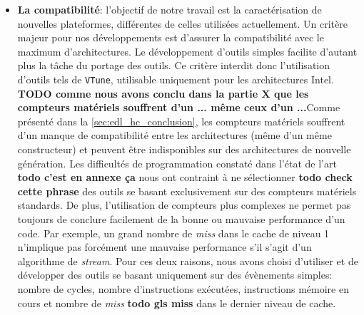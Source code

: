 \begin{itemize}
        \item \textbf{La compatibilité}: l'objectif de notre travail est la caractérisation de nouvelles plateformes, différentes de celles utilisées actuellement. Un critère majeur pour nos développements est d'assurer la compatibilité avec le maximum d'architectures. Le développement d'outils simples facilite d'autant plus la tâche du portage des outils. Ce critère interdit donc l'utilisation d'outils tels de \verb=VTune=, utilisable uniquement pour les architectures Intel.
        \textbf{TODO comme nous avons conclu dans la partie X que les compteurs matériels souffrent d'un ... même ceux d'un ...}Comme présenté dans la \autoref{sec:edl_hc_conclusion}, les compteurs matériels souffrent d'un manque de compatibilité entre les architectures (même d'un même constructeur) et peuvent être indisponibles sur des architectures de nouvelle génération. Les difficultés de programmation constaté dans l'état de l'art \textbf{todo c'est en annexe ça } nous ont contraint
        à ne sélectionner \textbf{todo check cette phrase} des outils se basant exclusivement sur des compteurs matériels standards. De plus, l'utilisation de compteurs plus complexes ne permet pas toujours de conclure facilement de la bonne ou mauvaise performance d'un code. Par exemple, un grand nombre de \textit{miss} dans le cache de niveau 1 n'implique pas forcément une mauvaise performance s'il s'agit d'un algorithme de \textit{stream}. Pour ces deux raisons, nous avons choisi d'utiliser et de développer des outils se basant uniquement sur des évènements simples: nombre de cycles, nombre d'instructions exécutées, instructions mémoire en cours et nombre de \textit{miss} \textbf{todo gls miss} dans le dernier niveau de cache.\\
        

\end{itemize}
